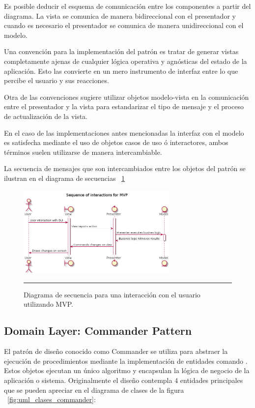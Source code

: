 Es posible deducir el esquema de comunicación entre los componentes a partir del diagrama. La vista se comunica de manera bidireccional con el presentador y cuando es necesario el presentador se comunica de manera unidireccional con el modelo.


Una convención para la implementación del patrón es tratar de generar vistas completamente ajenas de cualquier lógica operativa y agnósticas del estado de la aplicación. Esto las convierte en un mero instrumento de interfaz entre lo que percibe el usuario y sus reacciones. 

Otra de las convenciones sugiere utilizar objetos modelo-vista en la comunicación entre el presentador y la vista para estandarizar el tipo de mensaje y el proceso de actualización de la vista.

En el caso de las implementaciones antes mencionadas la interfaz con el modelo es satisfecha mediante el uso de objetos casos de uso ó interactores, ambos términos suelen utilizarse de manera intercambiable.

La secuencia de mensajes que son intercambiados entre los objetos del patrón se ilustran en el diagrama de secuencias ~\ref{fig:uml_mvp_sequence}

\begin{figure}[htbp]
	\centering
	\includegraphics[width=0.7\textwidth]{Figures/uml_mvp_sequence.png}
	\rule{35em}{1pt}
	\caption[MVP Sequence]{Diagrama de secuencia para una interacción con el usuario utilizando MVP.}
	\label{fig:uml_mvp_sequence}
\end{figure}

\subsection{Domain Layer: Commander Pattern}
El patrón de diseño conocido como Commander se utiliza para abstraer la ejecución de procedimientos mediante la implementación de entidades comando \cite{comm_sugrue}. Estos objetos ejecutan un único algoritmo y encapsulan la lógica de negocio de la aplicación o sistema.
Originalmente el diseño contempla 4 entidades principales que se pueden apreciar en el diagrama de clases de la figura ~\ref{fig:uml_clases_commander}:

